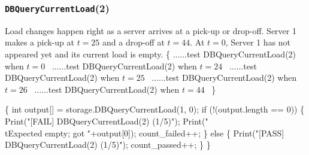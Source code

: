 \documentclass{article}
\def\nwendcode{\endtrivlist \endgroup}
\let\nwdocspar=\par
\begin{document}
\subsubsection{{\tt{}DBQueryCurrentLoad}(2)}
Load changes happen right as a server arrives at a pick-up or drop-off.
Server 1 makes a pick-up at $t=25$ and a drop-off at $t=44$. At $t=0$, Server 1
has not appeared yet and its current load is empty.
\nwenddocs{}\endmoddef{}
\{
  \LA{}......test \code{}DBQueryCurrentLoad\edoc{}(2) when $t=0$~{\nwtagstyle{}}\RA{}
  \LA{}......test \code{}DBQueryCurrentLoad\edoc{}(2) when $t=24$~{\nwtagstyle{}}\RA{}
  \LA{}......test \code{}DBQueryCurrentLoad\edoc{}(2) when $t=25$~{\nwtagstyle{}}\RA{}
  \LA{}......test \code{}DBQueryCurrentLoad\edoc{}(2) when $t=26$~{\nwtagstyle{}}\RA{}
  \LA{}......test \code{}DBQueryCurrentLoad\edoc{}(2) when $t=44$~{\nwtagstyle{}}\RA{}
\}
\nwendcode{}\nwdocspar
\nwenddocs{}\endmoddef{}
\{
  int output[] = storage.DBQueryCurrentLoad(1, 0);
  if (!(output.length == 0)) \{
    Print("[FAIL] DBQueryCurrentLoad(2) (1/5)");
    Print("\\tExpected empty; got "+output[0]);
    count_failed++;
  \} else \{
    Print("[PASS] DBQueryCurrentLoad(2) (1/5)");
    count_passed++;
  \}
\}
\nwendcode{}\nwdocspar
\nwenddocs{}\endmoddef{}
\end{document}
